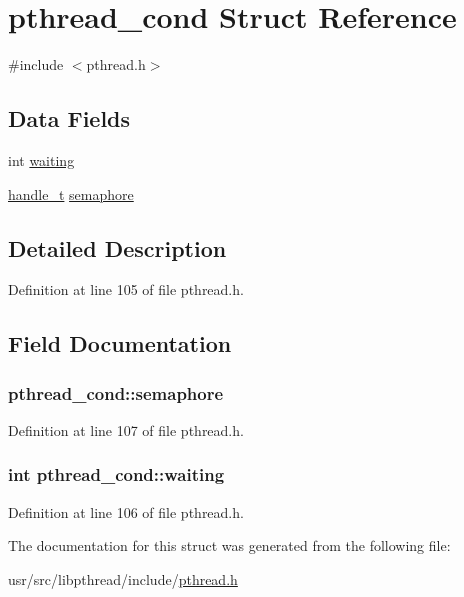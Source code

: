 \hypertarget{structpthread__cond}{\section{pthread\+\_\+cond Struct Reference}
\label{structpthread__cond}
}


{\ttfamily \#include $<$pthread.\+h$>$}

\subsection*{Data Fields}
\begin{DoxyCompactItemize}
\item 
int \hyperlink{structpthread__cond_a37ab813587afbb6cfc356963c7960776}{waiting}
\item 
\hyperlink{pthread_8h_aea4188cfb1472f9bb606fd2566133e34}{handle\+\_\+t} \hyperlink{structpthread__cond_add81721af4853baaa6a8f13733a527cc}{semaphore}
\end{DoxyCompactItemize}


\subsection{Detailed Description}


Definition at line 105 of file pthread.\+h.



\subsection{Field Documentation}
\hypertarget{structpthread__cond_add81721af4853baaa6a8f13733a527cc}{
\subsubsection[{semaphore}]{ pthread\+\_\+cond\+::semaphore}}\label{structpthread__cond_add81721af4853baaa6a8f13733a527cc}


Definition at line 107 of file pthread.\+h.

\hypertarget{structpthread__cond_a37ab813587afbb6cfc356963c7960776}{
\subsubsection[{waiting}]{\setlength{\rightskip}{0pt plus 5cm}int pthread\+\_\+cond\+::waiting}}\label{structpthread__cond_a37ab813587afbb6cfc356963c7960776}


Definition at line 106 of file pthread.\+h.



The documentation for this struct was generated from the following file\+:\begin{DoxyCompactItemize}
\item 
usr/src/libpthread/include/\hyperlink{pthread_8h}{pthread.\+h}\end{DoxyCompactItemize}
